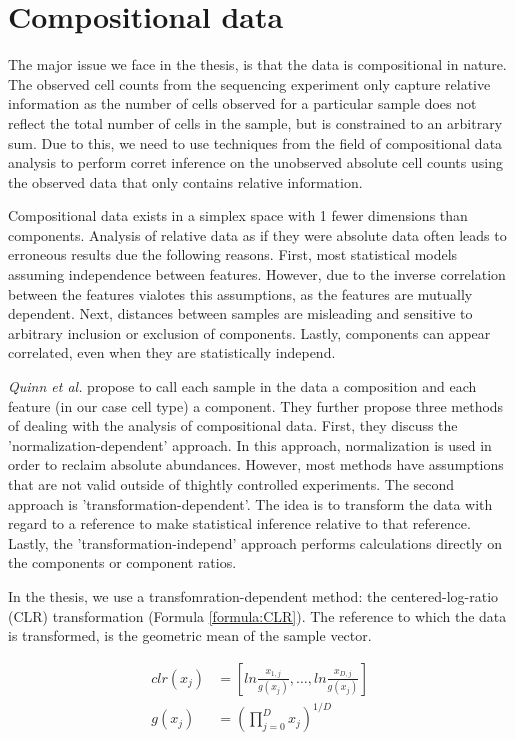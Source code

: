 \section{Compositional data}

The major issue we face in the thesis, is that the data is compositional in nature.
The observed cell counts from the sequencing experiment only capture relative information as the number of cells observed for a particular sample does not reflect the total number of cells in the sample, but is constrained to an arbitrary sum.
Due to this, we need to use techniques from the field of compositional data analysis to perform corret inference on the unobserved absolute cell counts using the observed data that only contains relative information.

Compositional data exists in a simplex space with 1 fewer dimensions than components. 
Analysis of relative data as if they were absolute data often leads to erroneous results due the following reasons.
First, most statistical models assuming independence between features.
However, due to the inverse correlation between the features vialotes this assumptions, as the features are mutually dependent.
Next, distances between samples are misleading and sensitive to arbitrary inclusion or exclusion of components.
Lastly, components can appear correlated, even when they are statistically independ.

\textit{Quinn et al.} propose to call each sample in the data a composition and each feature (in our case cell type) a component. 
They further propose three methods of dealing with the analysis of compositional data.
First, they discuss the 'normalization-dependent' approach. 
In this approach, normalization is used in order to reclaim absolute abundances.
However, most methods have assumptions that are not valid outside of thightly controlled experiments.
The second approach is 'transformation-dependent'.
The idea is to transform the data with regard to a reference to make statistical inference relative to that reference.
Lastly, the 'transformation-independ' approach performs calculations directly on the components or component ratios.

In the thesis, we use a transfomration-dependent method: the centered-log-ratio (CLR) transformation (Formula \ref{formula:CLR}).
The reference to which the data is transformed, is the geometric mean of the sample vector.

\begin{equation}
    \begin{split}
    clr(x_j) &= \left[ln \frac{x_{1,j}}{g(x_j)}, \ldots, ln \frac{x_{D,j}}{g(x_j)}\right] \\
    g(x_j) &= \left(\prod_{j = 0}^D x_j \right)^{1/D}
    \end{split}
    \label{formula:CLR}
\end{equation}


